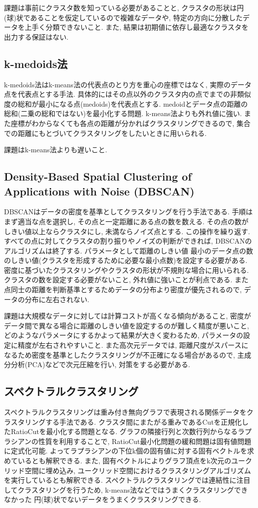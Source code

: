 \documentclass[dvipdfmx, 10pt]{jsarticle}
\begin{document}
課題は事前にクラスタ数を知っている必要があることと, 
クラスタの形状は円(球)状であることを仮定しているので複雑なデータや, 特定の方向に分散したデータを上手く分類できないこと. 
また, 結果は初期値に依存し最適なクラスタを出力する保証はない. 

\subsection*{k-medoids法}
k-medoids法はk-means法の代表点のとり方を重心の座標ではなく, 実際のデータ点を代表点とする手法. 
具体的にはその点以外のクラスタ内の点でまでの非類似度の総和が最小になる点(medoids)を代表点とする. 
medoidとデータ点の距離の総和(二乗の総和ではない)を最小化する問題. 
k-means法よりも外れ値に強い. また座標がわからなくても各点の距離が分かればクラスタリングできるので, 
集合での距離にもとづいてクラスタリングをしたいときに用いられる. 

課題はk-means法よりも遅いこと. 

\subsection*{Density-Based Spatial Clustering of Applications with Noise (DBSCAN)}
DBSCANはデータの密度を基準としてクラスタリングを行う手法である. 手順はまず適当な点を選択し, その点と一定距離にある点の数を数える. 
その点の数がしきい値以上ならクラスタにし, 未満ならノイズ点とする. この操作を繰り返す. 
すべての点に対してクラスタの割り振りやノイズの判断ができれば, DBSCANのアルゴリズムは終了する. パラメータとして距離のしきい値
最小のデータ点の数のしきい値(クラスタを形成するために必要な最小点数)を設定する必要がある. 
密度に基づいたクラスタリングやクラスタの形状が不規則な場合に用いられる. 
クラスタの数を設定する必要がないこと, 外れ値に強いことが利点である. 
また点同士の距離を判断基準とするためデータの分布より密度が優先されるので, データの分布に左右されない. 

課題は大規模なデータに対しては計算コストが高くなる傾向があること, 
密度がデータ間で異なる場合に距離のしきい値を設定するのが難しく精度が悪いこと, 
どのようなパラメータにするかよって結果が大きく変わるため, パラメータの設定に精度が左右されやすいこと. 
また高次元データでは, 距離尺度がスパースになるため密度を基準としたクラスタリングが不正確になる場合があるので, 
主成分分析(PCA)などで次元圧縮を行い, 対策をする必要がある. 

\subsection*{スペクトラルクラスタリング}
スペクトラルクラスタリングは重み付き無向グラフで表現される関係データをクラスタリングする手法である. 
クラスタ間にまたがる重みであるCutを正規化したRatioCutを最小化する問題となる. 
グラフの隣接行列と次数行列からなるラプラシアンの性質を利用することで, RatioCut最小化問題の緩和問題は固有値問題に定式化可能.  
よってラプラシアンの下位k個の固有値に対する固有ベクトルを求めているとも解釈できる. 
また, 固有ベクトルによりグラフ頂点をk次元のユークリッド空間に埋め込み, 
ユークリッド空間におけるクラスタリングアルゴリズムを実行しているとも解釈できる. 
スペクトラルクラスタリングでは連結性に注目してクラスタリングを行うため, k-means法などではうまくクラスタリングできなかった
円(球)状でないデータをうまくクラスタリングできる. 
\end{document}
